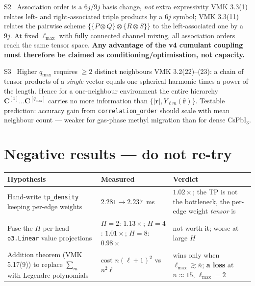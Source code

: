 \documentclass[10pt,a4paper]{article}
\newcommand{\BAD}[1]{\textcolor{BADred}{#1}}
\newcommand{\rr}{\bm{r}}
\newcommand{\code}[1]{\texttt{\small #1}}
\begin{document}
\begin{derbox}{S2 \ Association order is a $6j/9j$ basis change, \emph{not} extra expressivity}
\footnotesize
VMK 3.3(1) relates left- and right-associated triple products by a $6j$ symbol;
VMK 3.3(11) relates the pairwise scheme $\{\{P\otimes Q\}\otimes\{R\otimes S\}\}$ to the
left-associated one by a $9j$. At fixed $\ell_{\max}$ with fully connected channel mixing,
all association orders reach the same tensor space. \textbf{Any advantage of the v4
cumulant coupling must therefore be claimed as conditioning/optimisation, not capacity.}
\end{derbox}

\begin{derbox}{S3 \ Higher $q_{\max}$ requires $\ge 2$ distinct neighbours}
\footnotesize
VMK 3.2(22)--(23): a chain of tensor products of a \emph{single} vector equals one
spherical harmonic times a power of the length. Hence for a one-neighbour environment the
entire hierarchy $\bm C^{[1]}\ldots\bm C^{[q_{\max}]}$ carries no more information than
$\{|\rr|, Y_{\ell m}(\hat{\rr})\}$. Testable prediction: accuracy gain from
\code{correlation\_order} should scale with mean neighbour count --- weaker for
gas-phase methyl migration than for dense CsPbI$_3$.
\end{derbox}

\section{\BAD{Negative results --- do not re-try}}

\begin{center}\footnotesize
\begin{tabular}{@{}p{7.6cm}p{4.2cm}p{4.2cm}@{}}
\toprule
\textbf{Hypothesis} & \textbf{Measured} & \textbf{Verdict}\\
\midrule
Hand-write \code{tp\_density} keeping per-edge weights
& $2.281\to2.237$~ms & $1.02\times$; the TP is not the bottleneck, the per-edge weight \emph{tensor} is\\
\addlinespace
Fuse the $H$ per-head \code{o3.Linear} value projections
& $H{=}2$: $1.13\times$; $H{=}4$: $1.01\times$; $H{=}8$: $0.98\times$
& not worth it; worse at large $H$\\
\addlinespace
Addition theorem (VMK 5.17(9)) to replace $\sum_m$ with Legendre polynomials
& cost $n(\ell{+}1)^2$ vs $n^2\ell$
& wins only when $\ell_{\max}\gtrsim\bar n$; \textbf{a loss} at $\bar n\approx15$, $\ell_{\max}=2$\\
\bottomrule
\end{tabular}
\end{center}
\end{document}
